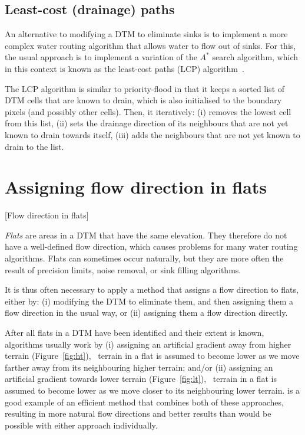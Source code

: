 \subsection{Least-cost (drainage) paths}

An alternative to modifying a DTM to eliminate sinks is to implement a more complex water routing algorithm that allows water to flow out of sinks.
For this, the usual approach is to implement a variation of the \(A^{*}\) search algorithm, which in this context is known as the least-cost paths (LCP) algorithm~\citep{Metz11}.

The LCP algorithm is similar to priority-flood in that it keeps a sorted list of DTM cells that are known to drain, which is also initialised to the boundary pixels (and possibly other cells).
Then, it iteratively: (i) removes the lowest cell from this list, (ii) sets the drainage direction of its neighbours that are not yet known to drain towards itself, (iii) adds the neighbours that are not yet known to drain to the list.

\section{Assigning flow direction in flats}[Flow direction in flats]

\emph{Flats} are areas in a DTM that have the same elevation.
They therefore do not have a well-defined flow direction, which causes problems for many water routing algorithms.
Flats can sometimes occur naturally, but they are more often the result of precision limits, noise removal, or sink filling algorithms.

It is thus often necessary to apply a method that assigns a flow direction to flats, either by: (i) modifying the DTM to eliminate them, and then assigning them a flow direction in the usual way, or (ii) assigning them a flow direction directly.

After all flats in a DTM have been identified and their extent is known, algorithms usually work by (i) assigning an artificial gradient away from higher terrain (Figure~\ref{fig:ht}), \ie\ terrain in a flat is assumed to become lower as we move farther away from its neighbouring higher terrain; and/or (ii) assigning an artificial gradient towards lower terrain (Figure~\ref{fig:lt}), \ie\ terrain in a flat is assumed to become lower as we move closer to its neighbouring lower terrain.
\citet{Barnes14} is a good example of an efficient method that combines both of these approaches, resulting in more natural flow directions and better results than would be possible with either approach individually.

